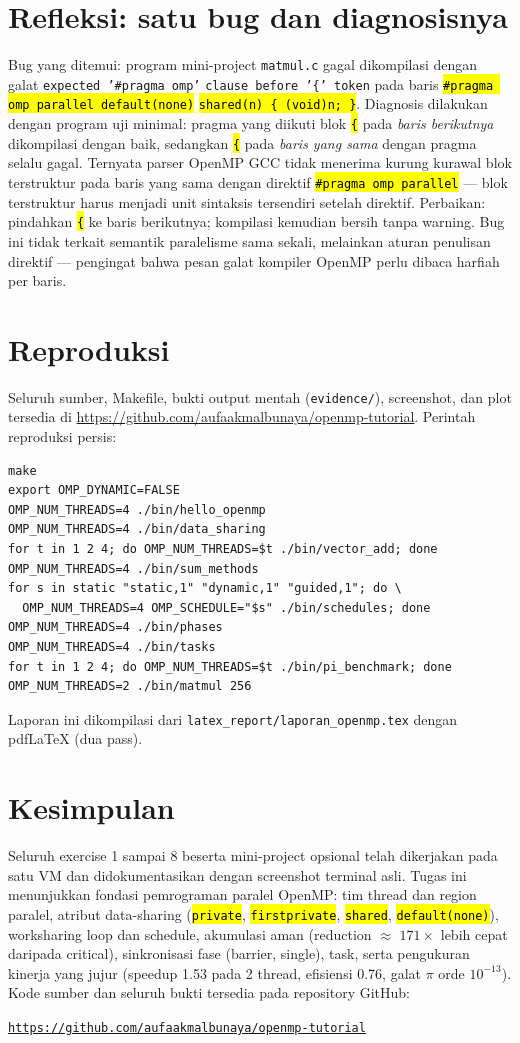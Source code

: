 \documentclass[11pt,a4paper]{article}
\newcommand{\cmd}[1]{\hl{\texttt{#1}}}
\begin{document}
\section{Refleksi: satu bug dan diagnosisnya}
{\sloppy
Bug yang ditemui: program mini-project \texttt{matmul.c} gagal dikompilasi dengan galat \texttt{expected '\#pragma omp'} \texttt{clause before '\{' token} pada baris \cmd{\#pragma omp parallel default(none)} \cmd{shared(n) \{ (void)n; \}}. Diagnosis dilakukan dengan program uji minimal: pragma yang diikuti blok \cmd{\{} pada \emph{baris berikutnya} dikompilasi dengan baik, sedangkan \cmd{\{} pada \emph{baris yang sama} dengan pragma selalu gagal. Ternyata parser OpenMP GCC tidak menerima kurung kurawal blok terstruktur pada baris yang sama dengan direktif \cmd{\#pragma omp parallel} --- blok terstruktur harus menjadi unit sintaksis tersendiri setelah direktif. Perbaikan: pindahkan \cmd{\{} ke baris berikutnya; kompilasi kemudian bersih tanpa warning. Bug ini tidak terkait semantik paralelisme sama sekali, melainkan aturan penulisan direktif --- pengingat bahwa pesan galat kompiler OpenMP perlu dibaca harfiah per baris.
\par}

\section{Reproduksi}
Seluruh sumber, Makefile, bukti output mentah (\texttt{evidence/}), screenshot, dan plot tersedia di \url{https://github.com/aufaakmalbunaya/openmp-tutorial}. Perintah reproduksi persis:
\begin{lstlisting}
make
export OMP_DYNAMIC=FALSE
OMP_NUM_THREADS=4 ./bin/hello_openmp
OMP_NUM_THREADS=4 ./bin/data_sharing
for t in 1 2 4; do OMP_NUM_THREADS=$t ./bin/vector_add; done
OMP_NUM_THREADS=4 ./bin/sum_methods
for s in static "static,1" "dynamic,1" "guided,1"; do \
  OMP_NUM_THREADS=4 OMP_SCHEDULE="$s" ./bin/schedules; done
OMP_NUM_THREADS=4 ./bin/phases
OMP_NUM_THREADS=4 ./bin/tasks
for t in 1 2 4; do OMP_NUM_THREADS=$t ./bin/pi_benchmark; done
OMP_NUM_THREADS=2 ./bin/matmul 256
\end{lstlisting}
Laporan ini dikompilasi dari \texttt{latex\_report/laporan\_openmp.tex} dengan pdfLaTeX (dua pass).

\section{Kesimpulan}
Seluruh exercise 1 sampai 8 beserta mini-project opsional telah dikerjakan pada satu VM dan didokumentasikan dengan screenshot terminal asli. Tugas ini menunjukkan fondasi pemrograman paralel OpenMP: tim thread dan region paralel, atribut data-sharing (\cmd{private}, \cmd{firstprivate}, \cmd{shared}, \cmd{default(none)}), worksharing loop dan schedule, akumulasi aman (reduction $\approx$ $171\times$ lebih cepat daripada critical), sinkronisasi fase (barrier, single), task, serta pengukuran kinerja yang jujur (speedup 1.53 pada 2 thread, efisiensi 0.76, galat $\pi$ orde $10^{-13}$). Kode sumber dan seluruh bukti tersedia pada repository GitHub:
\begin{center}
\href{https://github.com/aufaakmalbunaya/openmp-tutorial}{\texttt{https://github.com/aufaakmalbunaya/openmp-tutorial}}
\end{center}
\end{document}
